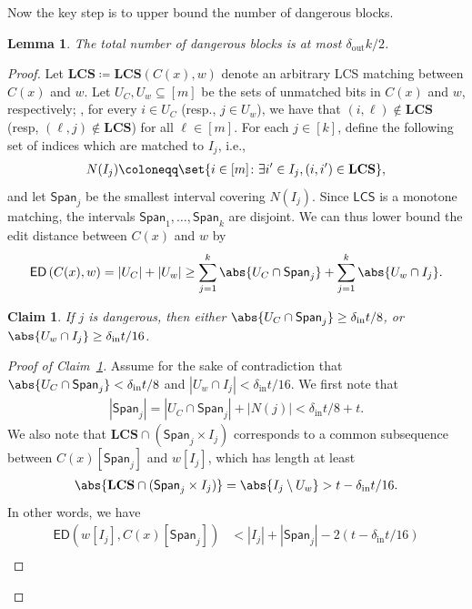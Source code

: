 \documentclass[10pt,a4paper]{article}
\newtheorem{lemma}{Lemma}
\newtheorem{claim}{Claim}
\theoremstyle{remark}
\newcommand{\ie}{\text{i.e.}\xspace}
\newcommand{\tuple}[1]{\ensuremath{\left(#1\right)}}
\newcommand{\tp}{\tuple}
\newcommand{\ED}{\ensuremath{\mathsf{ED}}\xspace}%
\newcommand{\dout}{\delta_{\text{out}}}
\newcommand{\din}{\delta_{\text{in}}}
\newcommand{\LCS}{\ensuremath{\mathbf{LCS}}\xspace}
\begin{document}
Now the key step is to upper bound the number of dangerous blocks.

\begin{lemma} \label{lem:dangerous-ub}
	The total number of dangerous blocks is at most $\dout k/2$.
\end{lemma}
\begin{proof}
	Let $\LCS \coloneqq \LCS(C(x), w)$ denote an arbitrary LCS matching between $C(x)$ and $w$. 
	Let $U_C, U_w \subseteq [m]$ be the sets of unmatched bits in $C(x)$ and $w$, respectively; \ie, for every $i \in U_C$ (resp., $j \in U_w$), we have that $(i,\ell) \not\in \LCS$ (resp, $(\ell, j) \not\in \LCS$) for all $\ell \in [m]$.
	For each $j \in [k]$, define the following set of indices which are matched to $I_j$, i.e.,
	\begin{align*}
		N(I_j) \coloneqq \set{i \in [m] \colon \exists i' \in I_j, (i,i') \in \LCS},
	\end{align*}
	and let $\textsf{Span}_j$ be the smallest interval covering $N(I_j)$. Since $\textsf{LCS}$ is a monotone matching, the intervals $\textsf{Span}_1, \dots, \textsf{Span}_k$ are disjoint. 
	We can thus lower bound the edit distance between $C(x)$ and $w$ by
	\begin{align*}
	\ED\tp{C(x), w} = |U_C| + |U_w| \ge \sum_{j=1}^{k}\abs{U_C \cap \textsf{Span}_j} + \sum_{j=1}^{k}\abs{U_w \cap I_j}.
	\end{align*}
	\begin{claim} \label{clm:dangerous-imply-error}
		If $j$ is dangerous, then either $\abs{U_C \cap \textsf{Span}_j} \ge \din t/8$, or $\abs{U_w \cap I_j} \ge \din t/16$.
	\end{claim}
	\begin{proof}[Proof of Claim~\ref{clm:dangerous-imply-error}]
		Assume for the sake of contradiction that  $\abs{U_C \cap \textsf{Span}_j} < \din t/8$ and $|U_w \cap I_j| < \din t/16$. We first note that
		\begin{align*}
		|\textsf{Span}_j| = |U_C \cap \textsf{Span}_j| + |N(j)| < \din t/8 + t.
		\end{align*}
		We also note that $\LCS \cap (\textsf{Span}_j \times I_j)$ corresponds to a common subsequence between $C(x)[\textsf{Span}_j]$ and $w[I_j]$, which has length at least
		\begin{align*}
			\abs{\LCS \cap (\textsf{Span}_j \times I_j)} = \abs{I_j \setminus U_w} > t-\din t/16.
		\end{align*}
		In other words, we have
		\begin{align*}
			\ED\tp{w[{I_j}], C(x)[{\textsf{Span}_j}]} &< |I_j| + |\textsf{Span}_j| - 2(t-\din t/16) \\ 

\end{align*}
\end{proof}
\end{proof}
\end{document}
